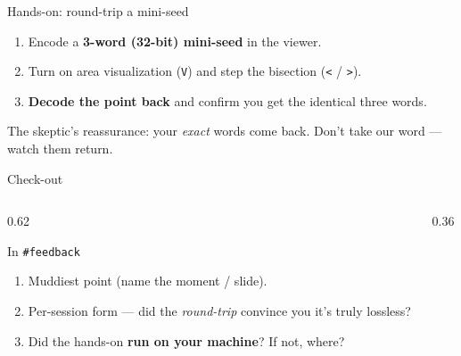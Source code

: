 \documentclass[aspectratio=169,11pt]{beamer}
\begin{document}
\begin{frame}{Hands-on: round-trip a mini-seed}
  \begin{tryit}[In session]
    \begin{enumerate}\small
      \item Encode a \textbf{3-word (32-bit) mini-seed} in the viewer.
      \item Turn on area visualization (\texttt{V}) and step the bisection
        (\texttt{<} / \texttt{>}).
      \item \textbf{Decode the point back} and confirm you get the identical
        three words.
    \end{enumerate}
  \end{tryit}
  \vspace{2pt}
  \begin{center}\small\color{graytext}
  The skeptic's reassurance: your \emph{exact} words come back. Don't take our
  word --- watch them return.
  \end{center}
\end{frame}

\begin{frame}{Check-out}
  \begin{columns}[T]
    \begin{column}{0.62\textwidth}
      \begin{block}{In \texttt{\#feedback}}
        \begin{enumerate}\small
          \item Muddiest point (name the moment / slide).
          \item Per-session form --- did the \emph{round-trip} convince you it's
            truly lossless?
          \item Did the hands-on \textbf{run on your machine}? If not, where?
        \end{enumerate}
      \end{block}
    \end{column}
    \begin{column}{0.36\textwidth}
    \end{column}
  \end{columns}
\end{frame}

\end{document}
